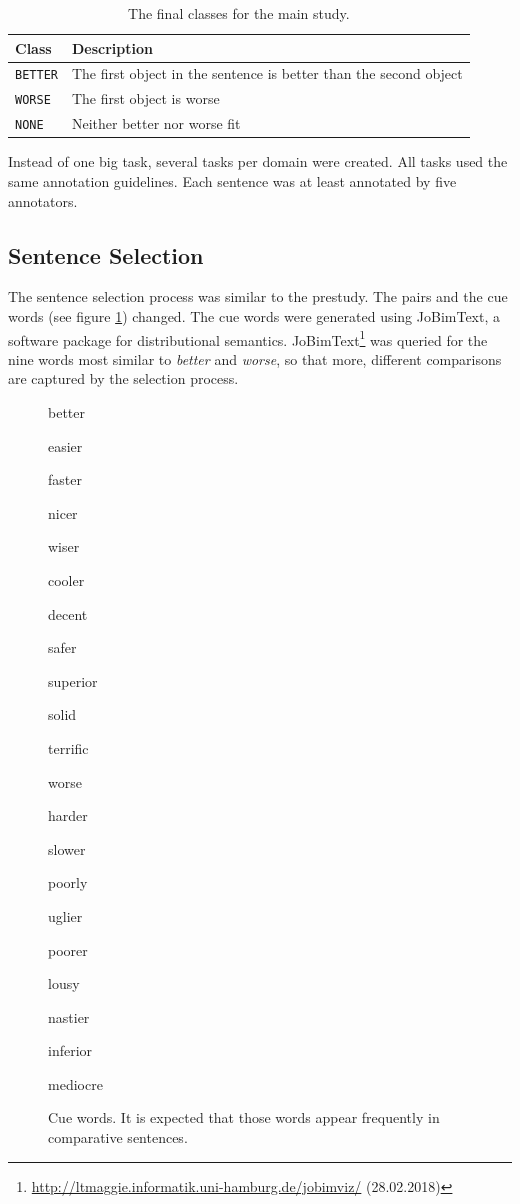 \begin{table}[h]
\centering
\caption{The final classes for the main study.}
\label{tbl:mainstudy-classes}
\begin{tabular}{@{}ll@{}}
\toprule
Class & Description \\ \midrule
\texttt{BETTER} & The first object in the sentence is better than the second object\\
\texttt{WORSE} & The first object is worse \\
\texttt{NONE} & Neither better nor worse fit\\
\bottomrule
\end{tabular}
\end{table}

Instead of one big task, several tasks per domain were created. All tasks used the same annotation guidelines. Each sentence was at least annotated by five annotators.


\subsection{Sentence Selection}
The sentence selection process was similar to the prestudy. The pairs and the cue words (see figure \ref{fig:cue_words}) changed. The cue words were generated using JoBimText, a software package for distributional semantics. JoBimText\footnote{\url{http://ltmaggie.informatik.uni-hamburg.de/jobimviz/} (28.02.2018)} was queried for the nine words most similar to \emph{better} and \emph{worse}, so that more, different comparisons are captured by the selection process.

\begin{figure}[hb]
\centering
\caption{Cue words. It is expected that those words appear frequently in comparative sentences.}
\label{fig:cue_words}
\begin{multicols}{4}
better

easier

faster

nicer

wiser

cooler

decent

safer

superior

solid

terrific

worse

harder

slower

poorly

uglier

poorer

lousy

nastier

inferior

mediocre
\end{multicols}
\end{figure}

